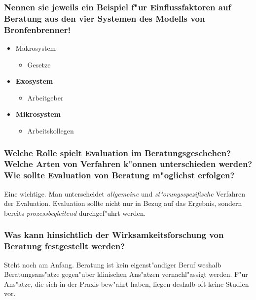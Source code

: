 \subsubsection{Nennen sie jeweils ein Beispiel f"ur Einflussfaktoren auf Beratung aus den vier Systemen des Modells von Bronfenbrenner!}
\begin{itemize}
        \item Makrosystem
                \begin{itemize}
                        \item Gesetze
                \end{itemize}
        \item \textbf{Exosystem}
                \begin{itemize}
                        \item Arbeitgeber
                \end{itemize}
        \item \textbf{Mikrosystem}
                \begin{itemize}
                        \item Arbeitskollegen
                \end{itemize}
\end{itemize}

\subsubsection{Welche Rolle spielt Evaluation im Beratungsgeschehen? Welche Arten von Verfahren k"onnen unterschieden werden? Wie sollte Evaluation von Beratung m"oglichst erfolgen?}
Eine wichtige. Man unterscheidet \emph{allgemeine} und \emph{st"orungsspezifische} Verfahren der Evaluation. Evaluation sollte nicht nur in Bezug auf das Ergebnis, sondern bereits \emph{prozessbegleitend} durchgef"uhrt werden.

\subsubsection{Was kann hinsichtlich der Wirksamkeitsforschung von Beratung festgestellt werden?}
Steht noch am Anfang. Beratung ist kein eigenst"andiger Beruf weshalb Beratungsans"atze gegen"uber klinischen Ans"atzen vernachl"assigt werden. F"ur Ans"atze, die sich in der Praxis bew"ahrt haben, liegen deshalb oft keine Studien vor.


